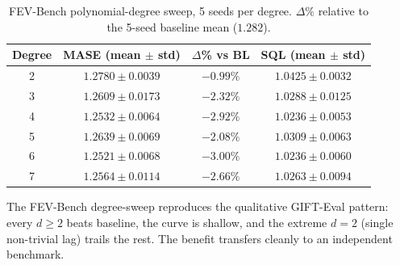 \documentclass{article}
\begin{document}
\begin{table}[H]
\centering
\caption{FEV-Bench polynomial-degree sweep, 5 seeds per degree. $\Delta\%$ relative to the 5-seed baseline mean ($1.282$).}
\small
\begin{tabular}{cccc}
\toprule
\textbf{Degree} & \textbf{MASE (mean $\pm$ std)} & \textbf{$\Delta$\% vs BL} & \textbf{SQL (mean $\pm$ std)} \\
\midrule
2 & $1.2780 \pm 0.0039$ & $-0.99\%$ & $1.0425 \pm 0.0032$ \\
3 & $1.2609 \pm 0.0173$ & $-2.32\%$ & $1.0288 \pm 0.0125$ \\
4 & $1.2532 \pm 0.0064$ & $-2.92\%$ & $1.0236 \pm 0.0053$ \\
5 & $1.2639 \pm 0.0069$ & $-2.08\%$ & $1.0309 \pm 0.0063$ \\
6 & $1.2521 \pm 0.0068$ & $-3.00\%$ & $1.0236 \pm 0.0060$ \\
7 & $1.2564 \pm 0.0114$ & $-2.66\%$ & $1.0263 \pm 0.0094$ \\
\bottomrule
\end{tabular}
\end{table}

The FEV-Bench degree-sweep reproduces the qualitative GIFT-Eval pattern: every $d \geq 2$ beats baseline, the curve is shallow, and the extreme $d{=}2$ (single non-trivial lag) trails the rest. The benefit transfers cleanly to an independent benchmark.

\end{document}
